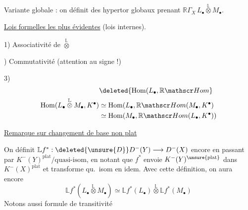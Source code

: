Variante globale : on définit des hypertor globaux  prenant $\mathbb R\Gamma_X\,L_{\bullet}\overset{\mathbb L}{\otimes}M_{\bullet}$.

\uline{Lois formelles les plus évidentes} (lois internes).

1) Associativité de $\overset{\mathbb L}{\otimes}$

) Commutativité (attention au signe !)

3)
\[
\begin{aligned}
&\deleted{\mathrm{Hom}(L_{\bullet},\mathbb R\mathscr Hom}\\
\mathrm{Hom}(L_{\bullet}\overset{\mathbb L}{\otimes}M_{\bullet},K^{\bullet})&\simeq\mathrm{Hom}(L_{\bullet},\mathbb R\mathscr Hom(M_{\bullet},K^{\bullet})\\
&\simeq\mathrm{Hom}(M_{\bullet},\mathbb R\mathscr Hom(L_{\bullet},K^{\bullet}))
\end{aligned}
\]

\uline{Remarque sur changement de base non plat}

On définit $\mathbb L f^*:\deleted{\unsure{D}}D^-(Y)\longrightarrow D^-(X)$ encore en passant par $K^-(Y)^{\mathrm{plat}}/\text{quasi-isom}$, en notant que $f^*$   envoie $K^-(Y)^{\unsure{\mathrm{plat}}}$ dans $K^-(X)^{\mathrm{plat}}$ et transforme qu.\ isom en idem. Avec cette définition, on aura encore
\[
\mathbb L f^*(L_{\bullet}\overset{\mathbb L}{\otimes}M_{\bullet})\simeq\mathbb L f^*(L_{\bullet})\overset{\mathbb L}{\otimes}\mathbb L f^*(M_{\bullet})
\]
Notons aussi formule de transitivité
